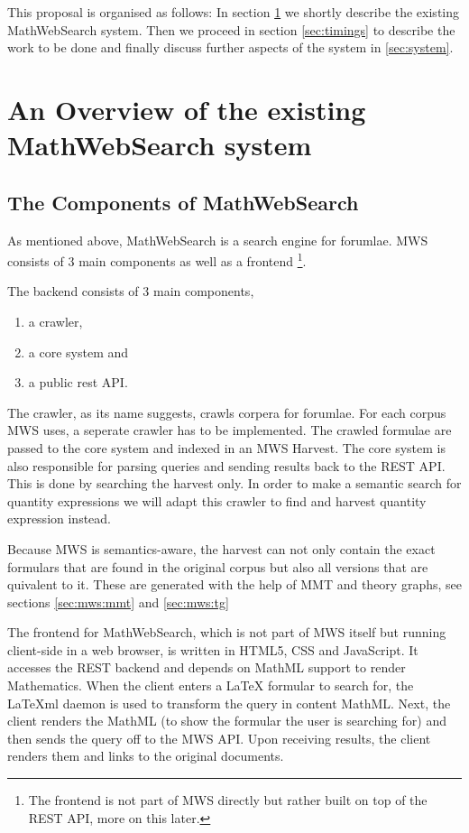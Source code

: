 \documentclass[11pt]{article}
\begin{document}
This proposal is organised as follows: In section \ref{sec:mws} we shortly describe the existing MathWebSearch system. Then we proceed in section \ref{sec:timings} to describe the work to be done and finally discuss further aspects of the system in \ref{sec:system}.

\section{An Overview of the existing MathWebSearch system}
\label{sec:mws}

\subsection{The Components of MathWebSearch}

As mentioned above, MathWebSearch is a search engine for forumlae. MWS consists of 3 main components as well as a frontend \footnote{The frontend is not part of MWS directly but rather built on top of the REST API, more on this later. }\cite{KohPro:MWSmanual}.

The backend consists of 3 main components,
\begin{enumerate}
  \item a crawler,
  \item a core system and
  \item a public rest API.
\end{enumerate}

The crawler, as its name suggests, crawls corpera for forumlae. For each corpus MWS uses, a seperate crawler has to be implemented. The crawled formulae are passed to the core system and indexed in an MWS Harvest. The core system is also responsible for parsing queries and sending results back to the REST API. This is done by searching the harvest only. In order to make a semantic search for quantity expressions we will adapt this crawler to find and harvest quantity expression instead.

Because MWS is semantics-aware, the harvest can not only contain the exact formulars that are found in the original corpus but also all versions that are quivalent to it. These are generated with the help of MMT and theory graphs, see sections \ref{sec:mws:mmt} and \ref{sec:mws:tg}

The frontend for MathWebSearch, which is not part of MWS itself but running client-side in a web browser, is written in HTML5, CSS and JavaScript. It accesses the REST backend and depends on MathML support to render Mathematics. When the client enters a \LaTeX{} formular to search for, the \LaTeX{}ml daemon \cite{latexml-daemon} is used to transform the query in content MathML. Next, the client renders the MathML (to show the formular the user is searching for) and then sends the query off to the MWS API. Upon receiving results, the client renders them and links to the original documents.
\end{document}
